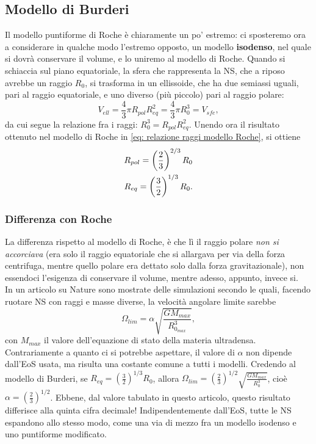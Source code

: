 \subsection{Modello di Burderi}
Il modello puntiforme di Roche è chiaramente un po' estremo: ci sposteremo ora a considerare in qualche modo l'estremo opposto, un modello \textbf{isodenso}, nel quale si dovrà conservare il volume, e lo uniremo al modello di Roche.
Quando si schiaccia sul piano equatoriale, la sfera che rappresenta la NS, che a riposo avrebbe un raggio $R_0$, si trasforma in un ellissoide, che ha due semiassi uguali, pari al raggio equatoriale, e uno diverso (più piccolo) pari al raggio polare:
\begin{equation}
    V_{ell} = \frac{4}{3}\pi R_{pol}R_{eq}^2 = \frac{4}{3}\pi R_0^3 = V_{sfe},
\end{equation}
da cui segue la relazione fra i raggi: $R_0^3 = R_{pol}R_{eq}^2 $.
Unendo ora il risultato ottenuto nel modello di Roche in \eqref{eq: relazione raggi modello Roche}, si ottiene
\begin{align}
    R_{pol} = \left(\frac{2}{3}\right)^{2/3}R_0 \notag\\
    R_{eq} = \left(\frac{3}{2}\right)^{1/3}R_0.
\end{align}
\subsubsection{Differenza con Roche}
La differenza rispetto al modello di Roche, è che lì il raggio polare \textit{non si accorciava} (era solo il raggio equatoriale che si allargava per via della forza centrifuga, mentre quello polare era dettato solo dalla forza gravitazionale), non essendoci l'esigenza di conservare il volume, mentre adesso, appunto, invece si.\vspace{2mm}\\
In un articolo su Nature sono mostrate delle simulazioni secondo le quali, facendo ruotare NS con raggi e masse diverse, la velocità angolare limite sarebbe
\begin{equation}
    \Omega_{lim} = \alpha\sqrt{\frac{GM_{max}}{R_{0_{max}}^3}},
\end{equation}
con $M_{max} $ il valore dell'equazione di stato della materia ultradensa.
Contrariamente a quanto ci si potrebbe aspettare, il valore di $\alpha$ non dipende dall'EoS usata, ma risulta una costante comune a tutti i modelli.
Credendo al modello di Burderi, se $R_{eq}=\left(\frac{3}{2}\right)^{1/3}R_0 $, allora $\Omega_{lim} = \left(\frac{2}{3} \right)^{1/2}\sqrt{\frac{GM_{max}}{R_0^3} }$, cioè $\alpha = \left(\frac{2}{3} \right)^{1/2}$.
Ebbene, dal valore tabulato in questo articolo, questo risultato differisce alla quinta cifra decimale!
Indipendentemente dall'EoS, tutte le NS espandono allo stesso modo, come una via di mezzo fra un modello isodenso e uno puntiforme modificato.
